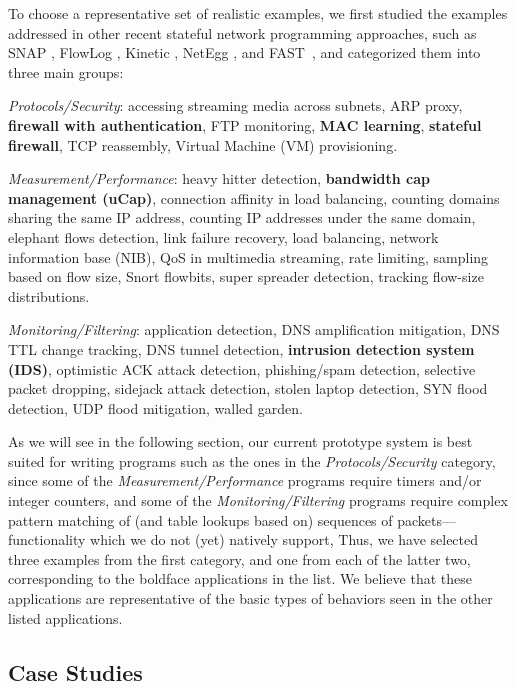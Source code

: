 \documentclass[pldi-cameraready]{sigplanconf}
\newcommand*\xmnote[3][0pt]{}
\begin{document}
To choose a representative set of realistic examples,
\xmnote{\FiveStar}{Q16}we first studied the examples addressed in other recent stateful network
programming approaches, such as
SNAP \cite{arashloo2015snap},
FlowLog \cite{nelson2014tierless},
Kinetic \cite{kim2015kinetic},
NetEgg \cite{yuan2015netegg}, and
FAST~\cite{moshref2014flow}, and
categorized them into three main groups:

\begin{compactitem}
\item {\em Protocols/Security}:
accessing streaming media across subnets, ARP proxy, {\bf firewall with authentication}, FTP monitoring, {\bf MAC learning}, {\bf stateful firewall}, TCP reassembly, Virtual Machine (VM) provisioning.
\item {\em Measurement/Performance}:
heavy hitter detection, {\bf bandwidth cap management (uCap)}, connection affinity in load balancing, counting domains sharing the same IP address, counting IP addresses under the same domain, elephant flows detection, link failure recovery, load balancing, network information base (NIB), QoS in multimedia streaming, rate limiting, sampling based on flow size, Snort flowbits, super spreader detection, tracking flow-size distributions.
\item {\em Monitoring/Filtering}:
application detection, DNS amplification mitigation, DNS TTL change tracking, DNS tunnel detection, {\bf intrusion detection system (IDS)}, optimistic ACK attack detection, phishing/spam detection, selective packet dropping, sidejack attack detection, stolen laptop detection, SYN flood detection, UDP flood mitigation, walled garden.
\end{compactitem}

\noindent
As we will see in the following section, our current prototype system is best suited for writing
programs such as the ones in the {\em Protocols/Security} category, since
some of the {\em Measurement/Performance}
programs require timers and/or integer counters,
and some of the {\em Monitoring/Filtering} programs require complex pattern matching of
(and table lookups based on)
sequences of packets---functionality which we do not (yet) natively support,
Thus, we have selected three examples from the first category, and one from each of the
latter two, corresponding to the boldface applications in the list.
We believe that these applications are representative of the basic types of behaviors seen in
the other listed applications.

\subsection{Case Studies}
\label{subsec:case}
\end{document}
